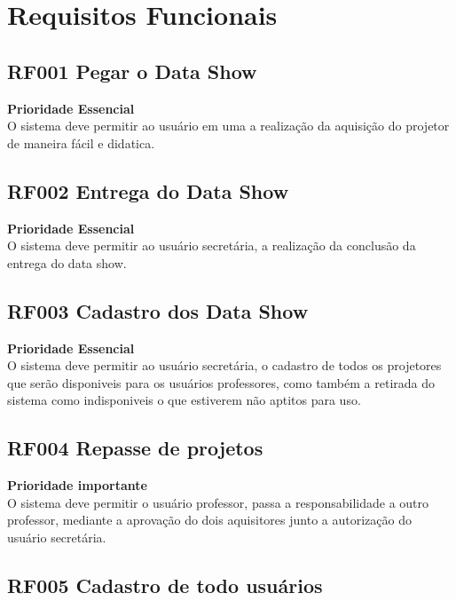\section{Requisitos Funcionais}
\hspace{2.0cm}

\subsection{\textbf{RF001 Pegar o Data Show}}

    \textbf{Prioridade Essencial}  \\

    O sistema deve permitir ao usuário em uma a realização da
    aquisição do projetor de maneira fácil e didatica.

\subsection{\textbf{RF002 Entrega do Data Show}}

    \textbf{Prioridade Essencial} \\

    O sistema deve permitir ao usuário secretária, a realização da conclusão da entrega do data show. 

\subsection{\textbf{RF003 Cadastro dos Data Show}}

    \textbf{Prioridade Essencial}\\

    O sistema deve permitir ao usuário secretária, o cadastro de todos os
    projetores que serão disponiveis para os usuários professores, como também a
    retirada do sistema como indisponiveis o que estiverem não aptitos para uso.


\subsection{\textbf{RF004 Repasse de projetos}}

    \textbf{Prioridade importante} \\
    
    O sistema deve permitir o usuário professor, passa a responsabilidade a
    outro professor, mediante a aprovação do dois aquisitores junto a
    autorização do usuário secretária. 


\subsection{\textbf{RF005 Cadastro de todo usuários}}

